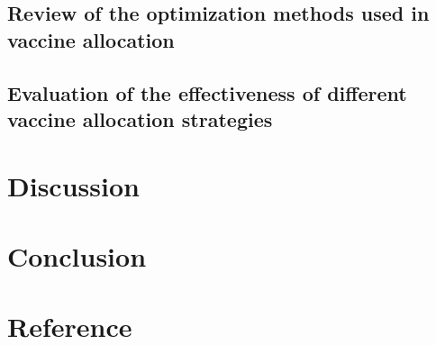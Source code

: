 \documentclass{article}
\begin{document}
\subsection{Review of the optimization methods used in vaccine allocation}
\subsection{Evaluation of the effectiveness of different vaccine allocation strategies}

\section{Discussion}
\label{sec:Discussion}
\section{Conclusion}
\label{sec:Conclusion}
\section{Reference}


\end{document}
